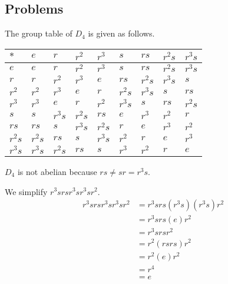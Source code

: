 \subsection*{Problems}
\begin{questions}
    \item The group table of $D_4$ is given as follows.
    \begin{table}[H]
        \centering
        \begin{tabular}{|l|l|l|l|l|l|l|l|l|}
        \hline
        $\ast$ & $e$    & $r$    & $r^2$  & $r^3$  & $s$    & $rs$   & $r^2s$ & $r^3s$ \\ \hline
        $e$    & $e$    & $r$    & $r^2$  & $r^3$  & $s$    & $rs$   & $r^2s$ & $r^3s$ \\ \hline
        $r$    & $r$    & $r^2$  & $r^3$  & $e$    & $rs$   & $r^2s$ & $r^3s$ & $s$    \\ \hline
        $r^2$  & $r^2$  & $r^3$  & $e$    & $r$    & $r^2s$ & $r^3s$ & $s$    & $rs$   \\ \hline
        $r^3$  & $r^3$  & $e$    & $r$    & $r^2$  & $r^3s$ & $s$    & $rs$   & $r^2s$ \\ \hline
        $s$    & $s$    & $r^3s$ & $r^2s$ & $rs$   & $e$    & $r^3$  & $r^2$  & $r$    \\ \hline
        $rs$   & $rs$   & $s$    & $r^3s$ & $r^2s$ & $r$    & $e$    & $r^3$  & $r^2$  \\ \hline
        $r^2s$ & $r^2s$ & $rs$   & $s$    & $r^3s$ & $r^2$  & $r$    & $e$    & $r^3$  \\ \hline
        $r^3s$ & $r^3s$ & $r^2s$ & $rs$   & $s$    & $r^3$  & $r^2$  & $r$    & $e$    \\ \hline
        \end{tabular}
    \end{table}
    \begin{partquestions}{\alph*}
        \item $D_4$ is not abelian because $rs \neq sr = r^3s$.
        \item We simplify $r^3srsr^3sr^3sr^2$.
        \begin{align*}
            r^3 sr sr^3 sr^3 sr^2 &= r^3srs(r^3s)(r^3s)r^2\\
            &= r^3 srs(e)r^2\\
            &= r^3 sr sr^2\\
            &= r^2(rs rs)r^2\\
            &= r^2(e)r^2\\
            &= r^4\\
            &= e
        \end{align*}
    \end{partquestions}


\end{questions}
